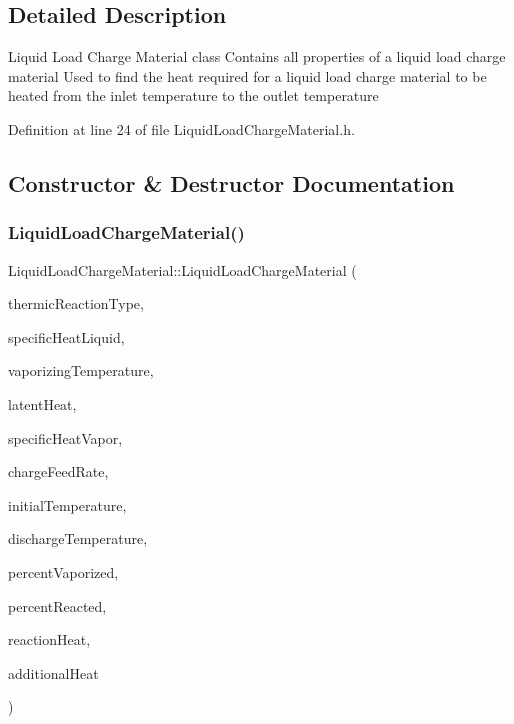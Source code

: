 \subsection{Detailed Description}
Liquid Load Charge Material class Contains all properties of a liquid load charge material Used to find the heat required for a liquid load charge material to be heated from the inlet temperature to the outlet temperature 

Definition at line 24 of file Liquid\+Load\+Charge\+Material.\+h.



\subsection{Constructor \& Destructor Documentation}
\mbox{\label{class_liquid_load_charge_material_ab6b2ef342701227c60dc380f5a576085}} 
\subsubsection{\texorpdfstring{Liquid\+Load\+Charge\+Material()}{LiquidLoadChargeMaterial()}}
{\footnotesize\ttfamily Liquid\+Load\+Charge\+Material\+::\+Liquid\+Load\+Charge\+Material (\begin{DoxyParamCaption}\item[{const \hyperlink{namespace_load_charge_material_a51d4263e865a5d86236622dd3fe23fd1}{Load\+Charge\+Material\+::\+Thermic\+Reaction\+Type}}]{thermic\+Reaction\+Type,  }\item[{const double}]{specific\+Heat\+Liquid,  }\item[{const double}]{vaporizing\+Temperature,  }\item[{const double}]{latent\+Heat,  }\item[{const double}]{specific\+Heat\+Vapor,  }\item[{const double}]{charge\+Feed\+Rate,  }\item[{const double}]{initial\+Temperature,  }\item[{const double}]{discharge\+Temperature,  }\item[{const double}]{percent\+Vaporized,  }\item[{const double}]{percent\+Reacted,  }\item[{const double}]{reaction\+Heat,  }\item[{const double}]{additional\+Heat }\end{DoxyParamCaption})\hspace{0.3cm}{\ttfamily [inline]}}

